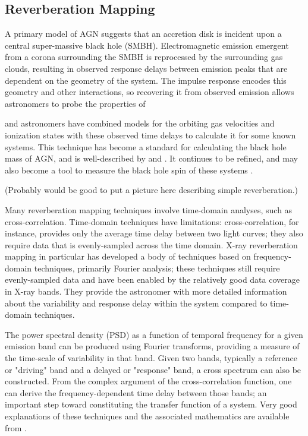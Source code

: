 \documentclass[11pt,letterpaper,fleqn]{article}
\begin{document}
	\subsection{Reverberation Mapping}
	A primary model of AGN suggests that an accretion disk is incident upon a
	central super-massive black hole (SMBH). Electromagnetic emission emergent
	from a corona surrounding the SMBH is reprocessed by the
	surrounding gas clouds, resulting in observed response delays between
	emission peaks that are dependent on the geometry of the system. The
	impulse response encodes this geometry and other interactions, so recovering it from observed emission allows astronomers to probe the properties of 

	and astronomers have combined
	models for the orbiting gas velocities and ionization states with these
	observed time delays to calculate it for some known systems. This
	technique has become a standard for calculating the black hole mass of
	AGN, and is well-described by \citet{2007MNRAS.380..669C} and
	\citet{2014A&ARv..22...72U}. It continues to be refined, and may also
	become a tool to measure the black hole spin of these systems
	\citet{2016arXiv160606736K}.

	(Probably would be good to put a picture here describing simple
	reverberation.)

	Many reverberation mapping techniques involve time-domain analyses, such
	as cross-correlation. Time-domain techniques have limitations:
	cross-correlation, for instance, provides only the average time delay
	between two light curves; they also require data that is evenly-sampled
	across the time domain. X-ray reverberation mapping in particular has
	developed a body of techniques based on frequency-domain techniques,
	primarily Fourier analysis; these techniques still require evenly-sampled
	data and have been enabled by the relatively good data coverage in X-ray
	bands. They provide the astronomer with more detailed information about
	the variability and response delay within the system compared to
	time-domain techniques.

	The power spectral density (PSD) as a function of temporal frequency for a
	given emission band can be produced using Fourier transforms, providing a
	measure of the time-scale of variability in that band. Given two bands,
	typically a reference or "driving" band and a delayed or "response" band,
	a cross spectrum can also be constructed. From the complex
	argument of the cross-correlation function, one can derive the
	frequency-dependent time delay between those bands; an important step
	toward
	constituting the transfer function of a system. Very good explanations of
	these techniques and the associated mathematics are available from
	\citet{2014A&ARv..22...72U}.
\end{document}
